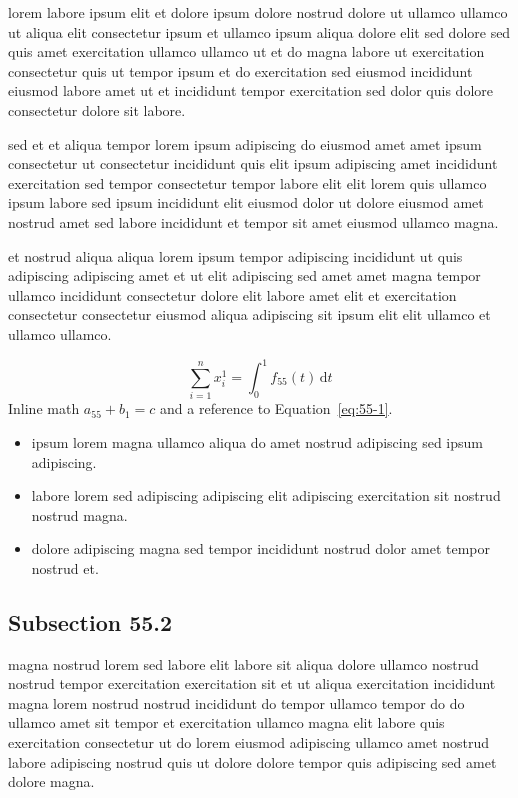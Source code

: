 \documentclass{article}
\begin{document}
lorem labore ipsum elit et dolore ipsum dolore nostrud dolore ut ullamco ullamco ut aliqua elit consectetur ipsum et ullamco ipsum aliqua dolore elit sed dolore sed quis amet exercitation ullamco ullamco ut et do magna labore ut exercitation consectetur quis ut tempor ipsum et do exercitation sed eiusmod incididunt eiusmod labore amet ut et incididunt tempor exercitation sed dolor quis dolore consectetur dolore sit labore.

sed et et aliqua tempor lorem ipsum adipiscing do eiusmod amet amet ipsum consectetur ut consectetur incididunt quis elit ipsum adipiscing amet incididunt exercitation sed tempor consectetur tempor labore elit elit lorem quis ullamco ipsum labore sed ipsum incididunt elit eiusmod dolor ut dolore eiusmod amet nostrud amet sed labore incididunt et tempor sit amet eiusmod ullamco magna.

et nostrud aliqua aliqua lorem ipsum tempor adipiscing incididunt ut quis adipiscing adipiscing amet et ut elit adipiscing sed amet amet magna tempor ullamco incididunt consectetur dolore elit labore amet elit et exercitation consectetur consectetur eiusmod aliqua adipiscing sit ipsum elit elit ullamco et ullamco ullamco.

\begin{equation}\label{eq:55-1}
  \sum_{i=1}^{n} x_i^{1} = \int_0^1 f_{55}(t)\,\mathrm{d}t
\end{equation}
Inline math $a_{55} + b_{1} = c$ and a reference to Equation~\eqref{eq:55-1}.

\begin{itemize}
  \item ipsum lorem magna ullamco aliqua do amet nostrud adipiscing sed ipsum adipiscing.
  \item labore lorem sed adipiscing adipiscing elit adipiscing exercitation sit nostrud nostrud magna.
  \item dolore adipiscing magna sed tempor incididunt nostrud dolor amet tempor nostrud et.
\end{itemize}

\subsection{Subsection 55.2}\label{sec:55-2}
magna nostrud lorem sed labore elit labore sit aliqua dolore ullamco nostrud nostrud tempor exercitation exercitation sit et ut aliqua exercitation incididunt magna lorem nostrud nostrud incididunt do tempor ullamco tempor do do ullamco amet sit tempor et exercitation ullamco magna elit labore quis exercitation consectetur ut do lorem eiusmod adipiscing ullamco amet nostrud labore adipiscing nostrud quis ut dolore dolore tempor quis adipiscing sed amet dolore magna.
\end{document}
